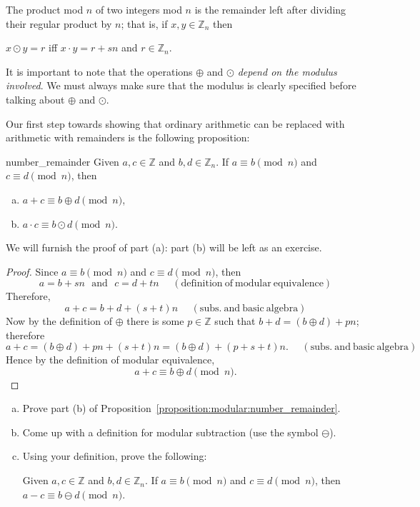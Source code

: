 \begin{defn}\label{definition:modular:mod_mult}

\noindent
The product mod $n$ of two integers mod $n$ is the remainder left after dividing their regular product by $n$; that is, if $x,y \in {\mathbb Z}_n$ then

\begin{center}
$x \odot y = r$ iff  $x \cdot y = r + sn$ and 
$r \in {\mathbb Z}_n.$
\end{center}
\end{defn}
It is important to note that the operations $\oplus$ and $\odot$ \emph{depend on the modulus involved}. We must always make sure that the modulus is clearly specified before talking about $\oplus$ and $\odot$.

Our first step towards showing that ordinary arithmetic can be replaced with arithmetic with remainders is the following proposition:

\begin{prop}{number_remainder}
Given $a,c \in {\mathbb Z}$ and $b,d \in {\mathbb Z_n}$. If $a \equiv b \pmod{n}$ and $c \equiv d \pmod{n}$, then 
\begin{enumerate}[(a)]
\item
$a + c \equiv b \oplus d \pmod{n}$, 
\item
$a \cdot c \equiv b \odot d \pmod{n}$.
\end{enumerate}
\end{prop}

\noindent
We will furnish the proof of part (a): part (b) will be left as an exercise.

\begin{proof}
Since $a \equiv b \pmod{n}$ and $c \equiv d \pmod{n}$, then
\[ a = b + sn \mathrm{~~~and~~~} c = d + tn  \mathrm{~~~~~~(definition~of~modular~equivalence)} \]
Therefore, 
\[ a + c = b + d + (s + t)n \mathrm{~~~~~~(subs.~and~ basic~algebra)} \]
Now by the definition of $\oplus$ there is some $p \in {\mathbb Z}$ such that  $b + d = (b \oplus d) + pn$; therefore 
\[ a + c = (b \oplus d) + pn + (s + t)n = (b \oplus d) + ( p + s + t)n. \mathrm{~~~~~~(subs.~and~ basic~algebra)} \]
Hence by the definition of modular equivalence, 
\[ a + c \equiv b \oplus d \pmod{n}. \]
\end{proof}

\begin{exercise}{44}
\begin{enumerate}[(a)]
\item
Prove part (b) of Proposition~\ref{proposition:modular:number_remainder}.
\item
Come up with a definition for modular subtraction (use the symbol $\ominus$).
\item
Using your definition, prove the following:

\noindent
Given $a,c \in {\mathbb Z}$ and $b,d \in {\mathbb Z_n}$. If $a \equiv b \pmod{n}$ and $c \equiv d \pmod{n}$, then  $a - c \equiv b\ominus d \pmod{n}$.
\end{enumerate}
\end{exercise}

